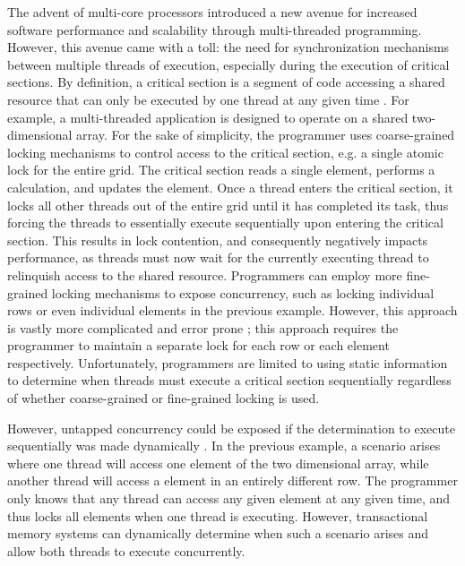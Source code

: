\documentclass[11pt]{book}
\begin{document}
The advent of multi-core processors introduced a new avenue for increased software
performance and scalability through multi-threaded programming.  However, this avenue came
with a toll: the need for synchronization mechanisms between multiple threads of
execution, especially during the execution of critical sections.  By definition, a
critical section is a segment of code accessing a shared resource that can only be
executed by one thread at any given time \cite{os_concepts}.  For example, a
multi-threaded application is designed to operate on a shared two-dimensional array.  For
the sake of simplicity, the programmer uses coarse-grained locking mechanisms to control
access to the critical section, e.g. a single atomic lock for the entire grid.  The
critical section reads a single element, performs a calculation, and updates the element.
Once a thread enters the critical section, it locks all other threads out of the entire
grid until it has completed its task, thus forcing the threads to essentially execute
sequentially upon entering the critical section.  This results in lock contention, and
consequently negatively impacts performance, as threads must now wait for the currently
executing thread to relinquish access to the shared resource.  Programmers can employ more
fine-grained locking mechanisms to expose concurrency, such as locking individual rows or
even individual elements in the previous example.  However, this approach is vastly more
complicated and error prone \cite{sle_rajwar}; this approach requires the programmer to
maintain a separate lock for each row or each element respectively.  Unfortunately,
programmers are limited to using static information to determine when threads must execute
a critical section sequentially regardless of whether coarse-grained or fine-grained
locking is used.

However, untapped concurrency could be exposed if the determination to execute
sequentially was made dynamically \cite{intel_prog_ref}.  In the previous example, a
scenario arises where one thread will access one element of the two dimensional array,
while another thread will access a element in an entirely different row.  The programmer
only knows that any thread can access any given element at any given time, and thus locks
all elements when one thread is executing.  However, transactional memory systems can
dynamically determine when such a scenario arises and allow both threads to execute
concurrently.
\end{document}
